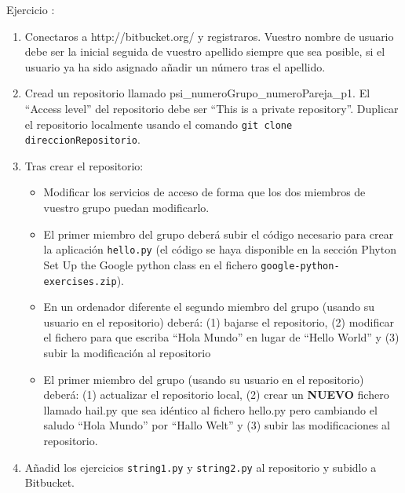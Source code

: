 \documentclass[12pt]{article} %
\newcounter{ejercicioNo}
\begin{document}
\begin{minipage}{\linewidth}
\begin{framed}
\addtocounter{ejercicioNo}{1} 
Ejercicio :
\begin{enumerate}
 \item Conectaros a http://bitbucket.org/ y registraros. Vuestro nombre de usuario debe ser la inicial seguida de vuestro apellido siempre que sea posible, si el usuario ya ha sido asignado añadir un n\'umero tras el apellido.
 \item Cread un repositorio llamado psi\_numeroGrupo\_numeroPareja\_p1. El ``Access level'' del repositorio debe ser ``This is a private repository''. Duplicar el repositorio localmente usando el comando \texttt{git clone direccionRepositorio}.

 \item Tras crear el repositorio:
 \begin{itemize}
 \item Modificar los servicios de acceso de forma que los dos miembros de vuestro grupo puedan modificarlo.
 \item El primer miembro del grupo deberá subir el c\'{o}digo necesario para crear la aplicación \texttt{hello.py} (el código se haya disponible en la sección Phyton Set Up the Google python class en el fichero \texttt{google-python-exercises.zip}).
 \item En un ordenador diferente el segundo miembro del grupo (usando su usuario en el repositorio) deberá: (1) bajarse el repositorio, (2) modificar el fichero  para que escriba ``Hola Mundo'' en lugar de ``Hello World''  y (3) subir la modificación al repositorio
   \item El primer miembro del grupo (usando su usuario en el repositorio) deberá: (1) actualizar el repositorio local, (2) crear un \textbf{NUEVO} fichero llamado hail.py  que sea idéntico al fichero hello.py pero cambiando el saludo ``Hola Mundo'' por ``Hallo Welt'' y (3) subir las modificaciones al repositorio.
 \end{itemize}
\item Añadid los ejercicios \texttt{string1.py} y \texttt{string2.py} al repositorio y subidlo a Bitbucket. 
\end{enumerate}
\end{framed}
\end{minipage}\\\\


\end{document}
